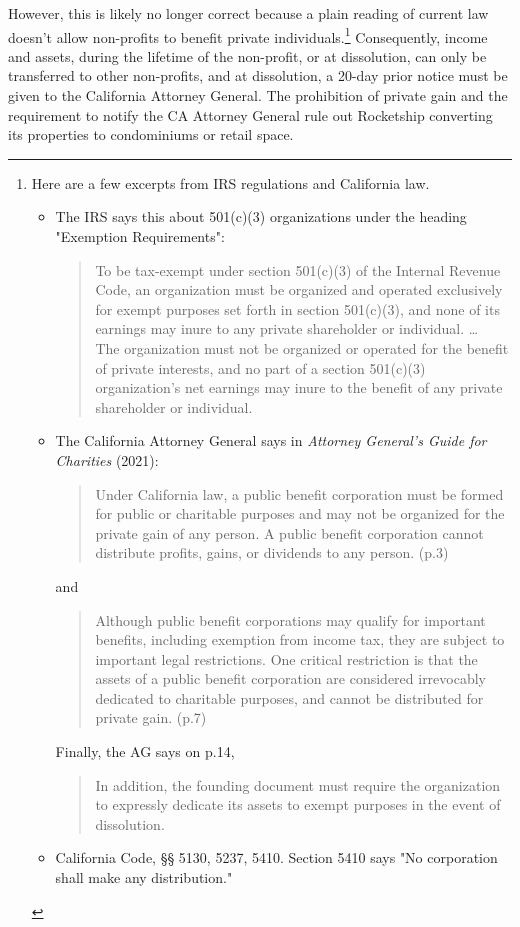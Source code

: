 However, this is likely no longer correct because a plain reading of current law doesn't allow non-profits to benefit private individuals.\footnote{Here are a few excerpts from IRS regulations and California law.
  
  \begin{itemize}
    \item The IRS says this about 501(c)(3) organizations under the heading "Exemption Requirements":
    \begin{quote}\noindent
      To be tax-exempt under section 501(c)(3) of the Internal Revenue Code, an organization must be organized and operated exclusively for exempt purposes set forth in section 501(c)(3), and none of its earnings may inure to any private shareholder or individual.
      \ldots\\
      The organization must not be organized or operated for the benefit of private interests, and no part of a section 501(c)(3) organization's net earnings may inure to the benefit of any private shareholder or individual.
    \end{quote}
    \item The California Attorney General says in \textit{Attorney General's Guide for Charities} (2021):
    \begin{quote}
      Under California law, a public beneﬁt corporation must be formed for public or charitable purposes and may not be organized for the private gain of any person. A public beneﬁt corporation cannot distribute proﬁts, gains, or dividends to any person. (p.3)
    \end{quote}
    and
    \begin{quote}
      Although public beneﬁt corporations may qualify for important beneﬁts, including exemption from income tax, they are subject to important legal restrictions. One critical restriction is that the assets of a public beneﬁt corporation are considered irrevocably dedicated to charitable purposes, and cannot be distributed for private gain. (p.7)
    \end{quote}
    Finally, the AG says on p.14,
    \begin{quote}
      In addition, the founding document must require the organization to expressly dedicate its assets to exempt purposes in the event of dissolution.
    \end{quote}
    \item California Code, §§ 5130, 5237, 5410. Section 5410 says "No corporation shall make any distribution."
  \end{itemize}}
Consequently, income and assets, during the lifetime of the non-profit, or at dissolution, can only be transferred to other non-profits, and at dissolution, a 20-day prior notice must be given to the California Attorney General. The prohibition of private gain and the requirement to notify the CA Attorney General rule out Rocketship converting its properties to condominiums or retail space.

